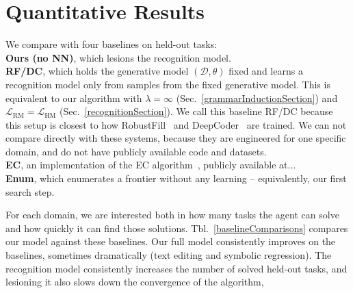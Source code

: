 \documentclass{article}
\newcommand{\probability}{\mathds{P}} %
\begin{document}


\section{Quantitative Results}\label{quantitative}

We compare  with four baselines on  held-out tasks:
\\\noindent \textbf{Ours (no NN)}, which lesions the recognition model.
\\\noindent \textbf{RF/DC}, which holds the generative model $(\mathcal{D},\theta)$ fixed and learns
a recognition model only from samples from the fixed generative model.
This is equivalent to our algorithm with $\lambda = \infty$ (Sec.~\ref{grammarInductionSection})
and $\mathcal{L}_{\text{RM}} = \mathcal{L}_{\text{HM}}$ (Sec.~\ref{recognitionSection}).
We call this baseline RF/DC because
this setup is closest to how RobustFill~\cite{devlin2017robustfill} and DeepCoder~\cite{balog2016deepcoder} are trained.
We can not compare directly with these systems,
because they are engineered for one specific domain, and 
do not have publicly available code and datasets.
\\\noindent \textbf{EC}, an implementation of the EC algorithm~\cite{Dechter:2013:BLV:2540128.2540316}, publicly available at...
\\\noindent \textbf{Enum}, which enumerates a frontier without any learning -- equivalently, our first search step.

For each domain,
we are interested both in how many tasks the
agent can solve and how quickly it can find those solutions.
Tbl.~\ref{baselineComparisons}
compares our model against these baselines.
Our full model consistently
improves on the baselines,
sometimes dramatically (text editing and symbolic regression).
The recognition model 
consistently increases the number of solved held-out tasks,
and lesioning it also slows down the convergence of the algorithm,
\end{document}
